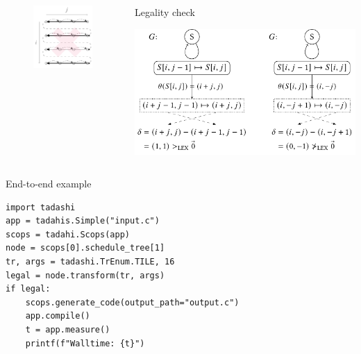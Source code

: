 \documentclass[presentation, aspectratio=169]{beamer}
\begin{document}
\begin{frame}[label={sec:orgea265b7}]{}
\begin{columns}
\begin{column}{0.45\columnwidth}
\begin{figure}
  {\includegraphics[width=0.48\linewidth]{figs/schedule-i-mj}}
  \label{fig:schedules}
\end{figure}
\end{column}
\begin{column}{0.52\columnwidth}
\begin{block}{Legality check}
\begin{center}
\includegraphics[width=\linewidth]{./figs/legality.pdf}
\end{center}
\end{block}
\end{column}
\end{columns}
\end{frame}
\begin{frame}[label={sec:orgc985d37},fragile]{End-to-end example}
 \begin{verbatim}
import tadashi
app = tadahis.Simple("input.c")
scops = tadahi.Scops(app)
node = scops[0].schedule_tree[1]
tr, args = tadashi.TrEnum.TILE, 16
legal = node.transform(tr, args)
if legal:
    scops.generate_code(output_path="output.c")
    app.compile()
    t = app.measure()
    printf(f"Walltime: {t}")
\end{verbatim}
\end{frame}
\end{document}
